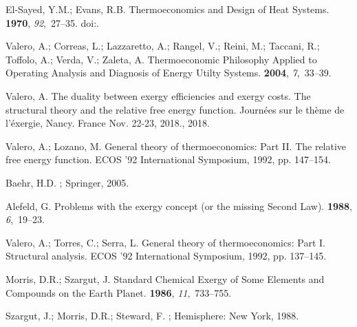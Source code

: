 \documentclass[energies,article,submit,moreauthors,pdftex]{Definitions/mdpi}
\begin{document}
\begin{thebibliography}{-------}
	El-Sayed, Y.M.; Evans, R.B.
	\newblock Thermoeconomics and Design of Heat Systems.
	 {\bf 1970}, {\em 92},~27--35.
	\newblock
	doi:{\href{https://doi.org/https://doi.org/10.1115/1.3445296}{}}.

	Valero, A.; Correas, L.; Lazzaretto, A.; Rangel, V.; Reini, M.; Taccani, R.;
	Toffolo, A.; Verda, V.; Zaleta, A.
	\newblock Thermoeconomic Philosophy Applied to Operating Analysis and Diagnosis
	of Energy Utilty Systems.
	 {\bf 2004}, {\em 7},~33--39.

	Valero, A.
	\newblock The duality between exergy efficiencies and exergy costs. {T}he
	structural theory and the relative free energy function.
	\newblock  Journées sur le thème de l'éxergie, Nancy. France Nov. 22-23,
	2018.,  2018.

	Valero, A.; Lozano, M.
	\newblock General theory of thermoeconomics: Part II. The relative free energy
	function.
	\newblock  ECOS '92 International Symposium,  1992, pp. 147--154.

	Baehr, H.D.
	; Springer,  2005.

	Alefeld, G.
	\newblock Problems with the exergy concept (or the missing {S}econd {L}aw).
	 {\bf 1988}, {\em 6},~19--23.

	Valero, A.; Torres, C.; Serra, L.
	\newblock General theory of thermoeconomics: Part I. Structural analysis.
	\newblock  ECOS '92 International Symposium,  1992, pp. 137--145.

	Morris, D.R.; Szargut, J.
	\newblock Standard Chemical Exergy of Some Elements and Compounds on the Earth
	Planet.
	 {\bf 1986}, {\em 11},~733--755.

	Szargut, J.; Morris, D.R.; Steward, F.
	; Hemisphere: New York, 1988.


\end{thebibliography}
\end{document}
